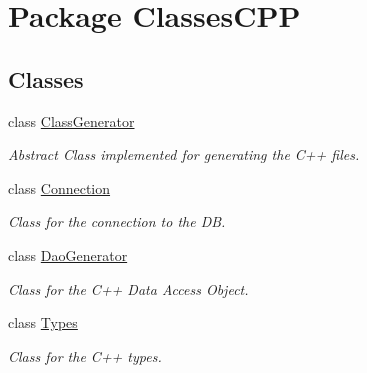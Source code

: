 \hypertarget{namespace_classes_c_p_p}{
\section{Package ClassesCPP}
\label{namespace_classes_c_p_p}
}
\subsection*{Classes}
\begin{DoxyCompactItemize}
\item 
class \hyperlink{class_classes_c_p_p_1_1_class_generator}{ClassGenerator}
\begin{DoxyCompactList}\small\item\em Abstract Class implemented for generating the C++ files. \end{DoxyCompactList}\item 
class \hyperlink{class_classes_c_p_p_1_1_connection}{Connection}
\begin{DoxyCompactList}\small\item\em Class for the connection to the DB. \end{DoxyCompactList}\item 
class \hyperlink{class_classes_c_p_p_1_1_dao_generator}{DaoGenerator}
\begin{DoxyCompactList}\small\item\em Class for the C++ Data Access Object. \end{DoxyCompactList}\item 
class \hyperlink{class_classes_c_p_p_1_1_types}{Types}
\begin{DoxyCompactList}\small\item\em Class for the C++ types. \end{DoxyCompactList}\end{DoxyCompactItemize}
